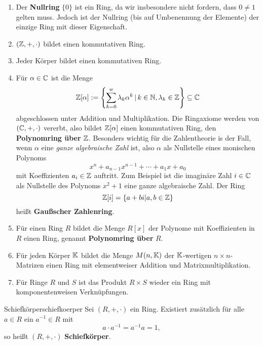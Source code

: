 \begin{beispiele}
\begin{enumerate}
\item Der \textbf{Nullring} $\{0\}$ ist ein Ring, da wir insbesondere nicht fordern, dass $0 \neq 1$ gelten muss. Jedoch ist der Nullring (bis auf Umbenennung der Elemente) der einzige Ring mit dieser Eigenschaft.
\item $(\mathbb{Z}, +, \cdot)$ bildet einen kommutativen Ring.
\item Jeder Körper bildet einen kommutativen Ring.
\item Für $\alpha \in \mathbb{C}$ ist die Menge 
\begin{equation}
\mathbb{Z} [\alpha] := \left\{ \sum_{k=0}^w \lambda_k \alpha^k \, | \, k \in \mathbb{N}, \lambda_k \in \mathbb{Z} \right\} \subseteq \mathbb{C}
\end{equation}
abgeschlossen unter Addition und Multiplikation. Die Ringaxiome werden von $(\mathbb{C}, +, \cdot)$ vererbt, also bildet $\mathbb{Z}[\alpha]$ einen kommutativen Ring, den \textbf{Polynomring über} $\mathbb{Z}$. Besonders wichtig für die Zahlentheorie is der Fall, wenn $\alpha$ eine \textit{ganze algebraische Zahl} ist, also $\alpha$ als Nullstelle eines monischen Polynoms
\begin{equation}
x^n + a_{n-1}x^{n-1} + \cdots + a_1x + a_0
\end{equation}
mit Koeffizienten $a_i \in \mathbb{Z}$ auftritt. Zum Beispiel ist die imaginäre Zahl $i \in \mathbb{C}$ als Nullstelle des Polynoms $x^2+1$ eine ganze algebraische Zahl. Der Ring
\begin{equation}
\mathbb{Z}[i] = \{ a+bi | a,b \in \mathbb{Z} \}
\end{equation}
heißt \textbf{Gaußscher Zahlenring}.
\item Für einen Ring $R$ bildet die Menge $R[x]$ der Polynome mit Koeffizienten in $R$ einen Ring, genannt \textbf{Polynomring über} $R$.
\item Für jeden Körper $\mathbb{K}$ bildet die Menge $M(n,\mathbb{K})$ der $\mathbb{K}$-wertigen $n \times n$-Matrizen einen Ring mit elementweiser Addition und Matrixmultiplikation.
\item Für Ringe $R$ und $S$ ist das Produkt $R \times S$ wieder ein Ring mit komponentenweisen Verknüpfungen. 
\end{enumerate}
\end{beispiele}
\begin{definition}{Schiefkörper}{schiefkoerper}
Sei $(R,+,\cdot)$ ein Ring. Existiert zusätzlich für alle $a \in R$ ein $a^{-1} \in R$ mit 
\begin{equation}
a \cdot a^{-1} = a^{-1} a = 1,
\end{equation}
so heißt $(R,+,\cdot)$ \textbf{Schiefkörper}.
\end{definition}
